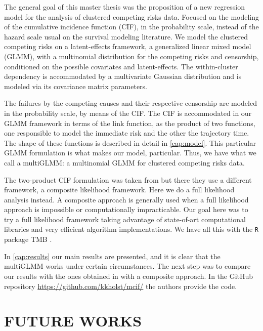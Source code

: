 The general goal of this master thesis was the proposition of a new
regression model for the analysis of clustered competing risks
data. Focused on the modeling of the cumulative incidence function
(CIF), in the probability scale, instead of the hazard scale usual on
the survival modeling literature. We model the clustered competing risks
on a latent-effects framework, a generalized linear mixed model (GLMM),
with a multinomial distribution for the competing risks and censorship,
conditioned on the possible covariates and latent-effects. The
within-cluster dependency is accommodated by a multivariate Gaussian
distribution and is modeled via its covariance matrix parameters.

The failures by the competing causes and their respective censorship are
modeled in the probability scale, by means of the CIF. The CIF is
accommodated in our GLMM framework in terms of the link function, as the
product of two functions, one responsible to model the immediate risk
and the other the trajectory time. The shape of these functions is
described in detail in \autoref{cap:model}. This particular GLMM
formulation is what makes our model, particular. Thus, we have what we
call a multiGLMM: a multinomial GLMM for clustered competing risks data.

The two-product CIF formulation was taken from  but
there they use a different framework, a composite likelihood
framework. Here we do a full likelihood analysis instead. A composite
approach is generally used when a full likelihood approach is impossible
or computationally impracticable. Our goal here was to try a full
likelihood framework taking advantage of state-of-art computational
libraries and very efficient algorithm implementations. We have all this
with the \texttt{R} \cite{R21} package TMB \cite{TMB}.

In \autoref{cap:results} our main results are presented, and it is clear
that the multiGLMM works under certain circumstances. The next step was
to compare our results with the ones obtained in 
with a composite approach. In the GitHub repository
\url{https://github.com/kkholst/mcif/} the authors provide the code.

\section{FUTURE WORKS}
\label{cap:future}

